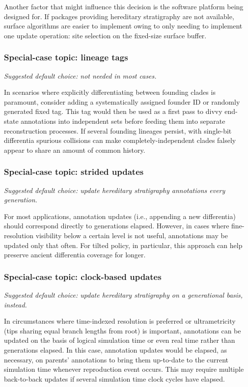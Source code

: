 Another factor that might influence this decision is the software platform being designed for.
If packages providing hereditary stratigraphy are not available, surface algorithms are easier to implement owing to only needing to implement one update operation: site selection on the fixed-size surface buffer.

\subsubsection{Special-case topic: lineage tags}
\textit{Suggested default choice: not needed in most cases.}

In scenarios where explicitly differentiating between founding clades is paramount, consider adding a systematically assigned founder ID or randomly generated fixed tag.
This tag would then be used as a first pass to divvy end-state annotations into independent sets before feeding them into separate reconstruction processes.
If several founding lineages persist, with single-bit differentia spurious collisions can make completely-independent clades falsely appear to share an amount of common history.

\subsubsection{Special-case topic: strided updates}
\textit{Suggested default choice: update hereditary stratigraphy annotations every generation.}

For most applications, annotation updates (i.e., appending a new differentia) should correspond directly to generations elapsed.
However, in cases where fine-resolution visibility below a certain level is not useful, annotations may be updated only that often.
For tilted policy, in particular, this approach can help preserve ancient differentia coverage for longer.

\subsubsection{Special-case topic: clock-based updates}
\textit{Suggested default choice: update hereditary stratigraphy on a generational basis, instead.}

In circumstances where time-indexed resolution is preferred or ultrametricity (tips sharing equal branch lengths from root) is important, annotations can be updated on the basis of logical simulation time or even real time rather than generations elapsed.
In this case, annotation updates would be elapsed, as necessary, on parents' annotations to bring them up-to-date to the current simulation time whenever reproduction event occurs.
This may require multiple back-to-back updates if several simulation time clock cycles have elapsed.

